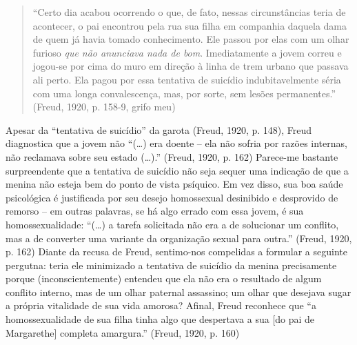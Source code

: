 \begin{quote}
``Certo dia acabou ocorrendo o que, de fato, nessas circunstâncias teria
de acontecer, o pai encontrou pela rua sua filha em companhia daquela
dama de quem já havia tomado conhecimento. Ele passou por elas com um
olhar furioso \emph{que não anunciava nada de bom}. Imediatamente a
jovem correu e jogou-se por cima do muro em direção à linha de trem
urbano que passava ali perto. Ela pagou por essa tentativa de suicídio
indubitavelmente séria com uma longa convalescença, mas, por sorte, sem
lesões permanentes.'' (Freud, 1920, p. 158-9, grifo meu)
\end{quote}

Apesar da ``tentativa de suicídio'' da garota (Freud, 1920, p. 148),
Freud diagnostica que a jovem não ``(\ldots{}) era doente -- ela não
sofria por razões internas, não reclamava sobre seu estado (\ldots{}).''
(Freud, 1920, p. 162) Parece-me bastante surpreendente que a tentativa
de suicídio não seja sequer uma indicação de que a menina não esteja bem
do ponto de vista psíquico. Em vez disso, sua boa saúde psicológica é
justificada por seu desejo homossexual desinibido e desprovido de
remorso -- em outras palavras, se há algo errado com essa jovem, é sua
homossexualidade: ``(\ldots{}) a tarefa solicitada não era a de
solucionar um conflito, mas a de converter uma variante da organização
sexual para outra.'' (Freud, 1920, p. 162) Diante da recusa de Freud,
sentimo-nos compelidas a formular a seguinte pergutna: teria ele
minimizado a tentativa de suicídio da menina precisamente porque
(inconscientemente) entendeu que ela não era o resultado de algum
conflito interno, mas de um olhar paternal assassino; um olhar que
desejava sugar a própria vitalidade de sua vida amorosa? Afinal, Freud
reconhece que ``a homossexualidade de sua filha tinha algo que
despertava a sua {[}do pai de Margarethe{]} completa amargura.'' (Freud,
1920, p. 160)

